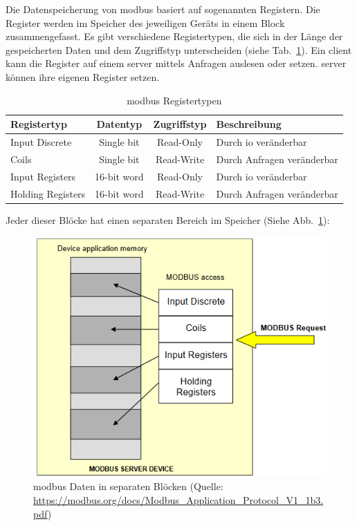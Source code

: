 Die Datenspeicherung von \gls{modbus} basiert auf sogenannten Registern. Die Register werden im Speicher des jeweiligen Geräts in einem Block zusammengefasst. Es gibt verschiedene Registertypen, die sich in der Länge der gespeicherten Daten und dem Zugriffstyp unterscheiden (siehe Tab.~\ref{tab:modbus_register}). \newline Ein \gls{client} kann die Register auf einem \gls{server} mittels Anfragen auslesen oder setzen. \gls{server} können ihre eigenen Register setzen.
\begin{table}[H]
	\caption{\gls{modbus} Registertypen \label{tab:modbus_register}}
	\begin{tabularx}{\textwidth}{@{}l|c|c|X@{}}
		\toprule
		\textbf{Registertyp} & \textbf{Datentyp} & \textbf{Zugriffstyp} & \textbf{Beschreibung} \\
		\midrule
		Input Discrete & Single bit & Read-Only & Durch \acf{io} veränderbar \\
		Coils & Single bit & Read-Write & Durch Anfragen veränderbar \\
		Input Registers & 16-bit word & Read-Only & Durch \acs{io} veränderbar \\
		Holding Registers & 16-bit word & Read-Write & Durch Anfragen veränderbar \\
		\bottomrule
	\end{tabularx}
\end{table} 
\cite{IPC2U_GmbH:o.J.}

Jeder dieser Blöcke hat einen separaten Bereich im Speicher (Siehe Abb.~\ref{fig:modbus_register_many_blocks}):
\begin{figure}[H]
	\centering
	\includegraphics[width=0.4\linewidth]{Bilder/Modbus_Data_Model_with_separate_block}
	\caption{\gls{modbus} Daten in separaten Blöcken (Quelle: \url{https://modbus.org/docs/Modbus_Application_Protocol_V1_1b3.pdf})}
	\label{fig:modbus_register_many_blocks}
\end{figure}

